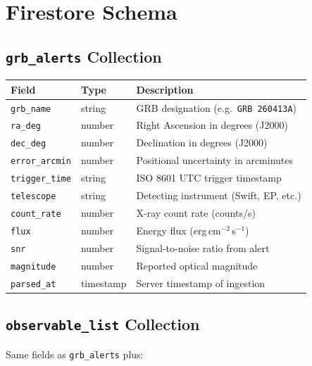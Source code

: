 \documentclass[12pt,a4paper]{article}
\begin{document}
\section{Firestore Schema}

\subsection{\texttt{grb\_alerts} Collection}

\begin{center}
\begin{tabular}{lll}
\toprule
Field & Type & Description \\
\midrule
\texttt{grb\_name} & string & GRB designation (e.g.\ \texttt{GRB 260413A}) \\
\texttt{ra\_deg} & number & Right Ascension in degrees (J2000) \\
\texttt{dec\_deg} & number & Declination in degrees (J2000) \\
\texttt{error\_arcmin} & number & Positional uncertainty in arcminutes \\
\texttt{trigger\_time} & string & ISO 8601 UTC trigger timestamp \\
\texttt{telescope} & string & Detecting instrument (Swift, EP, etc.) \\
\texttt{count\_rate} & number & X-ray count rate (counts/s) \\
\texttt{flux} & number & Energy flux (erg\,cm$^{-2}$\,s$^{-1}$) \\
\texttt{snr} & number & Signal-to-noise ratio from alert \\
\texttt{magnitude} & number & Reported optical magnitude \\
\texttt{parsed\_at} & timestamp & Server timestamp of ingestion \\
\bottomrule
\end{tabular}
\end{center}

\subsection{\texttt{observable\_list} Collection}

Same fields as \texttt{grb\_alerts} plus:
\end{document}
